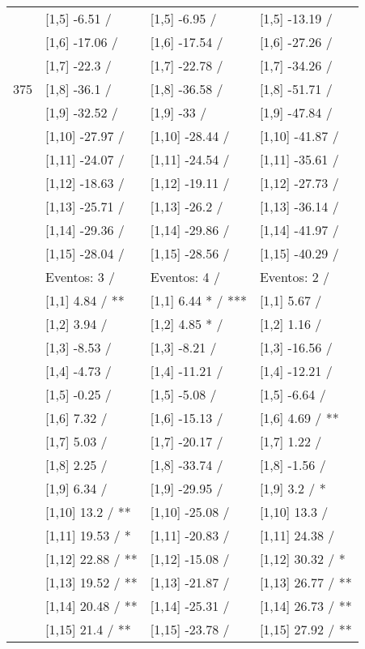 \begin{table}
\begin{tabular}[t]{llll}
 & {}[1,5] -6.51  / & {}[1,5] -6.95  / & {}[1,5] -13.19  /\\
 & {}[1,6] -17.06  / & {}[1,6] -17.54  / & {}[1,6] -27.26  /\\
 & {}[1,7] -22.3  / & {}[1,7] -22.78  / & {}[1,7] -34.26  /\\
375 & {}[1,8] -36.1  / & {}[1,8] -36.58  / & {}[1,8] -51.71  /\\
\addlinespace
 & {}[1,9] -32.52  / & {}[1,9] -33  / & {}[1,9] -47.84  /\\
 & {}[1,10] -27.97  / & {}[1,10] -28.44  / & {}[1,10] -41.87  /\\
 & {}[1,11] -24.07  / & {}[1,11] -24.54  / & {}[1,11] -35.61  /\\
 & {}[1,12] -18.63  / & {}[1,12] -19.11  / & {}[1,12] -27.73  /\\
 & {}[1,13] -25.71  / & {}[1,13] -26.2  / & {}[1,13] -36.14  /\\
\addlinespace
 & {}[1,14] -29.36  / & {}[1,14] -29.86  / & {}[1,14] -41.97  /\\
 & {}[1,15] -28.04  / & {}[1,15] -28.56  / & {}[1,15] -40.29  /\\
 & Eventos:  3 / & Eventos:  4 / & Eventos:  2 /\\
 & {}[1,1] 4.84  / ** & {}[1,1] 6.44 * / *** & {}[1,1] 5.67  /\\
 & {}[1,2] 3.94  / & {}[1,2] 4.85 * / & {}[1,2] 1.16  /\\
\addlinespace
 & {}[1,3] -8.53  / & {}[1,3] -8.21  / & {}[1,3] -16.56  /\\
 & {}[1,4] -4.73  / & {}[1,4] -11.21  / & {}[1,4] -12.21  /\\
 & {}[1,5] -0.25  / & {}[1,5] -5.08  / & {}[1,5] -6.64  /\\
 & {}[1,6] 7.32  / & {}[1,6] -15.13  / & {}[1,6] 4.69  / **\\
 & {}[1,7] 5.03  / & {}[1,7] -20.17  / & {}[1,7] 1.22  /\\
\addlinespace
500 & {}[1,8] 2.25  / & {}[1,8] -33.74  / & {}[1,8] -1.56  /\\
 & {}[1,9] 6.34  / & {}[1,9] -29.95  / & {}[1,9] 3.2  / *\\
 & {}[1,10] 13.2  / ** & {}[1,10] -25.08  / & {}[1,10] 13.3  /\\
 & {}[1,11] 19.53  / * & {}[1,11] -20.83  / & {}[1,11] 24.38  /\\
 & {}[1,12] 22.88  / ** & {}[1,12] -15.08  / & {}[1,12] 30.32  / *\\
\addlinespace
 & {}[1,13] 19.52  / ** & {}[1,13] -21.87  / & {}[1,13] 26.77  / **\\
 & {}[1,14] 20.48  / ** & {}[1,14] -25.31  / & {}[1,14] 26.73  / **\\
 & {}[1,15] 21.4  / ** & {}[1,15] -23.78  / & {}[1,15] 27.92  / **\\
\bottomrule
\end{tabular}
\end{table}
